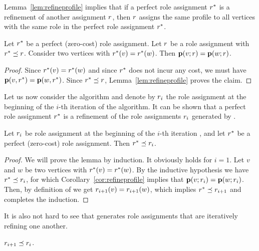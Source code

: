 Lemma~\ref{lem:refineprofile} implies 
that if a perfect role assignment $r^*$
is a refinement of another assignment $r$, 
then $r$ assigns the same profile to all vertices
with the same role in the perfect role assignment  $r^*$.

\begin{corollary}
\label{cor:refineprofile}
Let $r^*$ be a perfect (zero-cost) role assignment.
Let $r$ be a role assignment with $r^* \preceq r$.
Consider two vertices with $r^*(v) = r^*(w)$. 
Then $\prof{v; \role} = \prof{w; \role}$.
\end{corollary}

\begin{proof}
Since $r^*(v) = r^*(w)$ and 
since $r^*$ does not incur any cost, 
we must have $\prof{v, \role^*} = \prof{w, \role^*}$.
Since $r^* \preceq r$,
Lemma~\ref{lem:refineprofile} proves the claim.
\end{proof}

Let us now consider the {\algperfect} algorithm
and denote by $r_i$ the role assignment 
at the beginning of the $i$-th iteration of the algorithm.
It can be shown that a perfect role assignment  $r^*$ 
is a refinement of the role assignments $r_i$
generated by \algperfect.

\begin{lemma}
\label{lem:optimalrefine}
Let $r_i$ be role assignment 
at the beginning of the $i$-th iteration \algperfect, and
let $r^*$ be a perfect (zero-cost) role assignment. 
Then $r^* \preceq r_i$.
\end{lemma}


\begin{proof}
We will prove the lemma by induction. 
It obviously holds for $i = 1$.
Let $v$ and $w$ be two vertices with $r^*(v) = r^*(w)$.
By the inductive hypothesis we have  $r^* \preceq r_i$,
for which
Corollary~\ref{cor:refineprofile} implies that $\prof{v; \role_i} = \prof{w; \role_i}$.
Then, by definition of \algperfect
we get $r_{i + 1}(v) = r_{i + 1}(w)$, 
which implies $r^* \preceq r_{i+1}$ 
and completes the induction.
\end{proof}

It is also not hard to see that 
\algperfect generates role ass\-ign\-ments 
that are iteratively refining one another.

\begin{lemma}
\label{lem:progress}
$r_{i + 1} \preceq r_i$.
\end{lemma}

